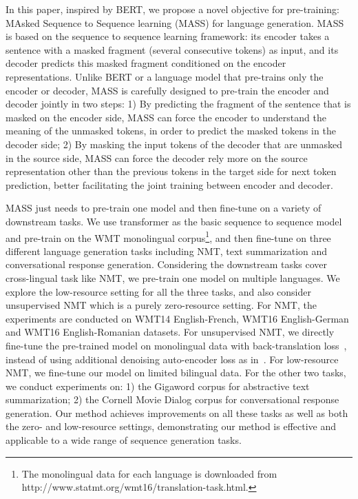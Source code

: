 \documentclass{article}
\begin{document}
	In this paper, inspired by BERT, we propose a novel objective for pre-training: MAsked Sequence to Sequence learning (MASS) for language generation. MASS is based on the sequence to sequence learning framework: its encoder takes a sentence with a masked fragment (several consecutive tokens) as input, and its decoder predicts this masked fragment conditioned on the encoder representations. Unlike BERT or a language model that pre-trains only the encoder or decoder, MASS is carefully designed to pre-train the encoder and decoder jointly in two steps: 1) By predicting the fragment of the sentence that is masked on the encoder side, MASS can force the encoder to understand the meaning of the unmasked tokens, in order to predict the masked tokens in the decoder side; 2) By masking the input tokens of the decoder that are unmasked in the source side, MASS can force the decoder rely more on the source representation other than the previous tokens in the target side for next token prediction, better facilitating the joint training between encoder and decoder.
	


	MASS just needs to pre-train one model and then fine-tune on a variety of downstream tasks. We use transformer as the basic sequence to sequence model and pre-train on the WMT monolingual corpus\footnote{The monolingual data for each language is downloaded from http://www.statmt.org/wmt16/translation-task.html.}, and then fine-tune on three different language generation tasks including NMT, text summarization and conversational response generation. Considering the downstream tasks cover cross-lingual task like NMT, we pre-train one model on multiple languages. We explore the low-resource setting for all the three tasks, and also consider unsupervised NMT which is a purely zero-resource setting. For NMT, the experiments are conducted on WMT14 English-French, WMT16 English-German and WMT16 English-Romanian datasets. For unsupervised NMT, we directly fine-tune the pre-trained model on monolingual data with back-translation loss~\citep{DBLP:conf/emnlp/LampleOCDR18}, instead of using additional denoising auto-encoder loss as in~\citet{DBLP:conf/emnlp/LampleOCDR18}. For low-resource NMT, we fine-tune our model on limited bilingual data.  For the other two tasks, we conduct experiments on: 1) the Gigaword corpus for abstractive text summarization; 2) the Cornell Movie Dialog corpus for conversational response generation. Our method achieves improvements on all these tasks as well as both the zero- and low-resource settings, demonstrating our method is effective and applicable to a wide range of sequence generation tasks. 
\end{document}
